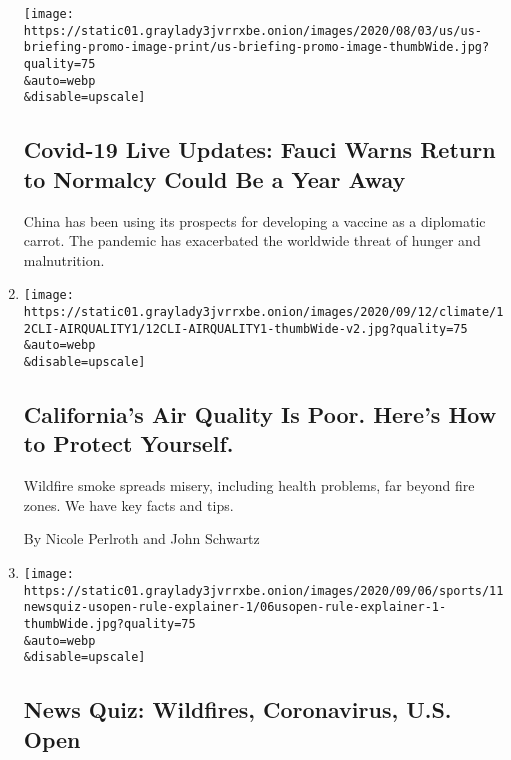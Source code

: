 \begin{enumerate}
  \texttt{[image: https://static01.graylady3jvrrxbe.onion/images/2020/08/03/us/us-briefing-promo-image-print/us-briefing-promo-image-thumbWide.jpg?quality=75\\\&auto=webp\\\&disable=upscale]}

  \hypertarget{covid-19-live-updates-fauci-warns-return-to-normalcy-could-be-a-year-away}{%
  \subsection{Covid-19 Live Updates: Fauci Warns Return to Normalcy
  Could Be a Year
  Away}\label{covid-19-live-updates-fauci-warns-return-to-normalcy-could-be-a-year-away}}

  China has been using its prospects for developing a vaccine as a
  diplomatic carrot. The pandemic has exacerbated the worldwide threat
  of hunger and malnutrition.
\item
  \href{/2020/09/11/climate/california-smoke-wildfires.html}{}

  \texttt{[image: https://static01.graylady3jvrrxbe.onion/images/2020/09/12/climate/12CLI-AIRQUALITY1/12CLI-AIRQUALITY1-thumbWide-v2.jpg?quality=75\\\&auto=webp\\\&disable=upscale]}

  \hypertarget{californias-air-quality-is-poor-heres-how-to-protect-yourself}{%
  \subsection{California's Air Quality Is Poor. Here's How to Protect
  Yourself.}\label{californias-air-quality-is-poor-heres-how-to-protect-yourself}}

  Wildfire smoke spreads misery, including health problems, far beyond
  fire zones. We have key facts and tips.

  By Nicole Perlroth and John Schwartz
\item
  \href{/interactive/2020/09/11/briefing/news-quiz-wildfires-coronavirus-tennis.html}{}

  \texttt{[image: https://static01.graylady3jvrrxbe.onion/images/2020/09/06/sports/11newsquiz-usopen-rule-explainer-1/06usopen-rule-explainer-1-thumbWide.jpg?quality=75\\\&auto=webp\\\&disable=upscale]}

  \hypertarget{news-quiz-wildfires-coronavirus-us-open}{%
  \subsection{News Quiz: Wildfires, Coronavirus, U.S.
  Open}\label{news-quiz-wildfires-coronavirus-us-open}}


\end{enumerate}
